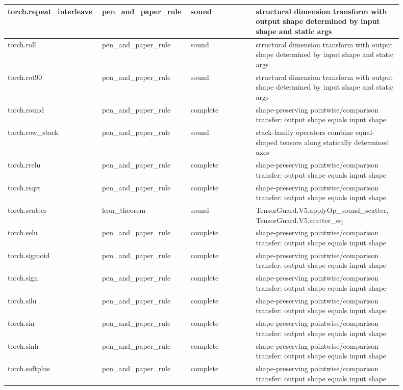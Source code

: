 \documentclass[10pt]{article}
\begin{document}
\begin{longtable}{|p{0.20\linewidth}|p{0.18\linewidth}|p{0.16\linewidth}|p{0.36\linewidth}|}
\hline
torch.repeat\_interleave & pen\_and\_paper\_rule & sound & structural dimension transform with output shape determined by input shape and static args \\
\hline
torch.roll & pen\_and\_paper\_rule & sound & structural dimension transform with output shape determined by input shape and static args \\
\hline
torch.rot90 & pen\_and\_paper\_rule & sound & structural dimension transform with output shape determined by input shape and static args \\
\hline
torch.round & pen\_and\_paper\_rule & complete & shape-preserving pointwise/comparison transfer: output shape equals input shape \\
\hline
torch.row\_stack & pen\_and\_paper\_rule & sound & stack-family operators combine equal-shaped tensors along statically determined axes \\
\hline
torch.rrelu & pen\_and\_paper\_rule & complete & shape-preserving pointwise/comparison transfer: output shape equals input shape \\
\hline
torch.rsqrt & pen\_and\_paper\_rule & complete & shape-preserving pointwise/comparison transfer: output shape equals input shape \\
\hline
torch.scatter & lean\_theorem & sound & TensorGuard.V5.applyOp\_sound\_scatter, TensorGuard.V5.scatter\_eq \\
\hline
torch.selu & pen\_and\_paper\_rule & complete & shape-preserving pointwise/comparison transfer: output shape equals input shape \\
\hline
torch.sigmoid & pen\_and\_paper\_rule & complete & shape-preserving pointwise/comparison transfer: output shape equals input shape \\
\hline
torch.sign & pen\_and\_paper\_rule & complete & shape-preserving pointwise/comparison transfer: output shape equals input shape \\
\hline
torch.silu & pen\_and\_paper\_rule & complete & shape-preserving pointwise/comparison transfer: output shape equals input shape \\
\hline
torch.sin & pen\_and\_paper\_rule & complete & shape-preserving pointwise/comparison transfer: output shape equals input shape \\
\hline
torch.sinh & pen\_and\_paper\_rule & complete & shape-preserving pointwise/comparison transfer: output shape equals input shape \\
\hline
torch.softplus & pen\_and\_paper\_rule & complete & shape-preserving pointwise/comparison transfer: output shape equals input shape \\

\end{longtable}
\end{document}
